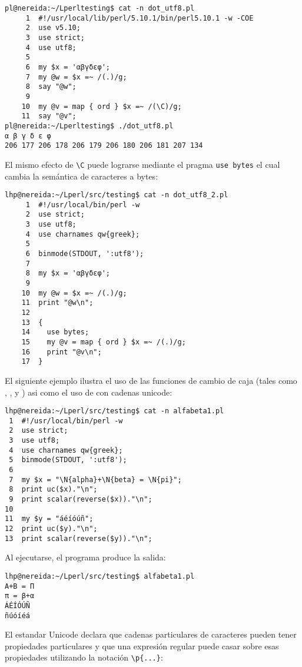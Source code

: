 \begin{htmlonly}
\begin{htmlonly}
\begin{verbatim}
pl@nereida:~/Lperltesting$ cat -n dot_utf8.pl
     1  #!/usr/local/lib/perl/5.10.1/bin/perl5.10.1 -w -COE
     2  use v5.10;
     3  use strict;
     4  use utf8;
     5
     6  my $x = 'αβγδεφ';
     7  my @w = $x =~ /(.)/g;
     8  say "@w";
     9
    10  my @v = map { ord } $x =~ /(\C)/g;
    11  say "@v";
pl@nereida:~/Lperltesting$ ./dot_utf8.pl
α β γ δ ε φ
206 177 206 178 206 179 206 180 206 181 207 134
\end{verbatim}

El mismo efecto de \verb|\C| puede lograrse mediante el
pragma \verb|use bytes| el cual cambia la semántica de caracteres
a bytes:

\begin{verbatim}
lhp@nereida:~/Lperl/src/testing$ cat -n dot_utf8_2.pl
     1  #!/usr/local/bin/perl -w
     2  use strict;
     3  use utf8;
     4  use charnames qw{greek};
     5
     6  binmode(STDOUT, ':utf8');
     7
     8  my $x = 'αβγδεφ';
     9
    10  my @w = $x =~ /(.)/g;
    11  print "@w\n";
    12
    13  {
    14    use bytes;
    15    my @v = map { ord } $x =~ /(.)/g;
    16    print "@v\n";
    17  }
\end{verbatim}


El siguiente ejemplo ilustra el uso de 
las funciones de cambio de caja 
(tales como , ,  y )
asi como el uso de  con cadenas unicode:
\begin{verbatim}
lhp@nereida:~/Lperl/src/testing$ cat -n alfabeta1.pl
 1  #!/usr/local/bin/perl -w
 2  use strict;
 3  use utf8;
 4  use charnames qw{greek};
 5  binmode(STDOUT, ':utf8');
 6
 7  my $x = "\N{alpha}+\N{beta} = \N{pi}";
 8  print uc($x)."\n";
 9  print scalar(reverse($x))."\n";
10
11  my $y = "áéíóúñ";
12  print uc($y)."\n";
13  print scalar(reverse($y))."\n";
\end{verbatim}
Al ejecutarse, el programa produce la salida:

\begin{verbatim}
lhp@nereida:~/Lperl/src/testing$ alfabeta1.pl
Α+Β = Π
π = β+α
ÁÉÍÓÚÑ
ñúóíéá
\end{verbatim}


El estandar Unicode declara que cadenas particulares de caracteres
pueden tener propiedades particulares y que una expresión regular puede
casar sobre esas propiedades utilizando la notación \verb|\p{...}|:


\end{htmlonly}
\end{htmlonly}
